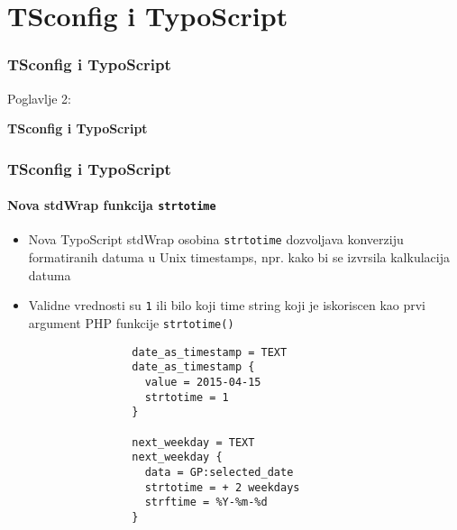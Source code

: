 %

\section{TSconfig i TypoScript}
\begin{frame}[fragile]
	\frametitle{TSconfig i TypoScript}

	\begin{center}\huge{Poglavlje 2:}\end{center}
	\begin{center}\huge{\color{typo3darkgrey}\textbf{TSconfig i TypoScript}}\end{center}

\end{frame}

\begin{frame}[fragile]
	\frametitle{TSconfig i TypoScript}
	\framesubtitle{Nova stdWrap funkcija \texttt{strtotime}}

	\lstset{basicstyle=\tiny\ttfamily}

	\begin{itemize}

		\item Nova TypoScript stdWrap osobina \texttt{strtotime} dozvoljava konverziju
		formatiranih datuma u Unix timestamps, npr. kako bi se izvrsila kalkulacija datuma

		\item Validne vrednosti su \texttt{1} ili bilo koji time string koji je iskoriscen
		kao prvi argument PHP funkcije \texttt{strtotime()}

			\begin{lstlisting}
				date_as_timestamp = TEXT
				date_as_timestamp {
				  value = 2015-04-15
				  strtotime = 1
				}

				next_weekday = TEXT
				next_weekday {
				  data = GP:selected_date
				  strtotime = + 2 weekdays
				  strftime = %Y-%m-%d
				}
			\end{lstlisting}

	\end{itemize}

\end{frame}

